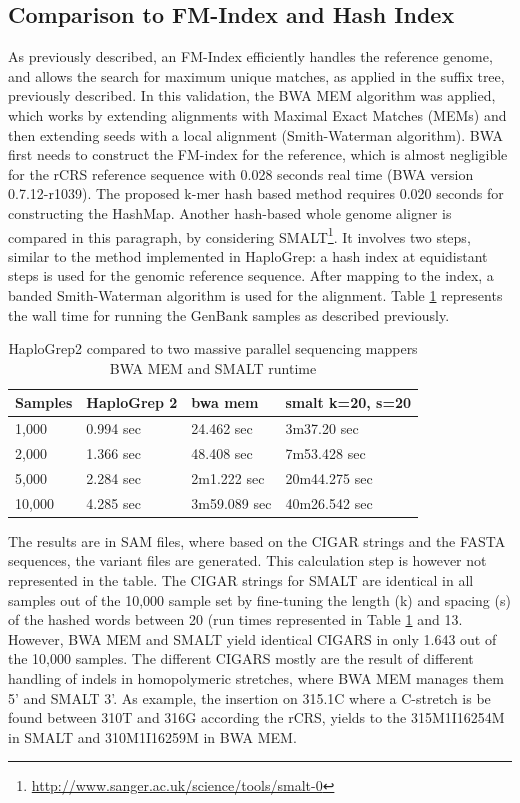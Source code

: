 \subsection{Comparison to FM-Index and Hash Index}
As previously described, an FM-Index efficiently handles the reference genome, and allows the search for maximum unique matches, as applied in the suffix tree, previously described. In this validation, the BWA MEM\cite{Li2012a} algorithm was applied, which works by extending alignments with Maximal Exact Matches (MEMs) and then extending seeds with a local alignment (Smith-Waterman algorithm).    
BWA first needs to construct the FM-index for the reference, which is almost negligible for the rCRS reference sequence with 0.028 seconds real time (BWA version 0.7.12-r1039). The proposed k-mer hash based method requires 0.020 seconds for constructing the HashMap. Another hash-based whole genome aligner is compared in this paragraph, by considering SMALT\footnote{\url{http://www.sanger.ac.uk/science/tools/smalt-0}}. 
It involves two steps, similar to the method implemented in HaploGrep: a hash index at equidistant steps is used for the genomic reference sequence. After mapping to the index, a banded Smith-Waterman algorithm is used for the alignment. Table \ref{time:BWA:SMALT} represents the wall time for running the GenBank samples as described previously. 
\begin{table}[H]
\centering
\caption{HaploGrep2 compared to two massive parallel sequencing mappers BWA MEM and SMALT runtime}
\label{time:BWA:SMALT}
\begin{tabular}{|l|l|l|l|}
\hline
\textbf{Samples} &  \textbf{HaploGrep 2} &  \textbf{bwa mem}  &  \textbf{smalt k=20, s=20} \\ \hline
1,000  & 0.994 sec     & 24.462 sec  &    3m37.20 sec \\ \hline
2,000  & 1.366 sec    & 48.408 sec  &    7m53.428 sec \\ \hline
5,000  & 2.284 sec    & 2m1.222 sec &   20m44.275 sec \\ \hline
10,000 & 4.285 sec    & 3m59.089 sec  &  40m26.542 sec  \\ \hline 
\end{tabular}
\end{table}
The results are in SAM files, where based on the CIGAR strings and the FASTA sequences, the variant files are generated. This calculation step is however not represented in the table. 
The CIGAR strings for SMALT are identical in all samples out of the 10,000 sample set by fine-tuning the length (k) and spacing (s) of the hashed words between 20 (run times represented in Table \ref{time:BWA:SMALT} and 13. However, BWA MEM and SMALT yield identical CIGARS in only 1.643 out of the 10,000 samples. The different CIGARS mostly are the result of different handling of indels in homopolymeric stretches, where BWA MEM manages them 5' and SMALT 3'. As example, the insertion on 315.1C where a C-stretch is be found between 310T and 316G according the rCRS, yields to the 315M1I16254M in SMALT and 310M1I16259M in BWA MEM.


